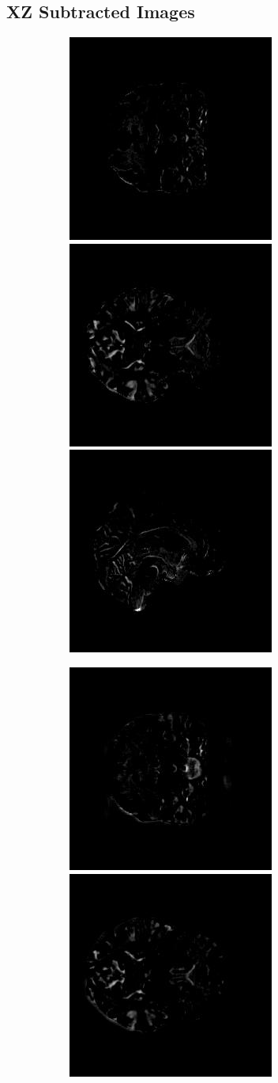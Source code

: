\documentclass[11pt, fleqn, titlepage]{article}
\newcommand\skipperer{0.45pt}
\newcommand\ripperer{1.25pt}
\newcommand{\1}[1]{\mathds{1}\left[#1\right]}
\begin{document}
\subsection{XZ Subtracted Images}\label{xz_subtracted_images}
\begin{figure}[H]
	\centering
	\begin{subfigure}[b]{0.8\textwidth}
		\centering
		\includegraphics[width=0.22\linewidth]{imgs/subtracted_images/xz/002_S_0559_xy_gts_comparison}
		\hskip\skipperer
		\includegraphics[width=0.22\linewidth]{imgs/subtracted_images/xz/002_S_0559_xz_gts_comparison}
		\hskip\skipperer
		\includegraphics[width=0.22\linewidth]{imgs/subtracted_images/xz/002_S_0559_yz_gts_comparison}
	\end{subfigure}
	\vskip\ripperer
	\begin{subfigure}[b]{0.8\textwidth}
		\centering
		\includegraphics[width=0.22\linewidth]{imgs/subtracted_images/xz/002_S_0559_xy_1.5_1.5gen_comparison}
		\hskip\skipperer
		\includegraphics[width=0.22\linewidth]{imgs/subtracted_images/xz/002_S_0559_xz_1.5_1.5gen_comparison}

\end{subfigure}
\end{figure}
\end{document}
